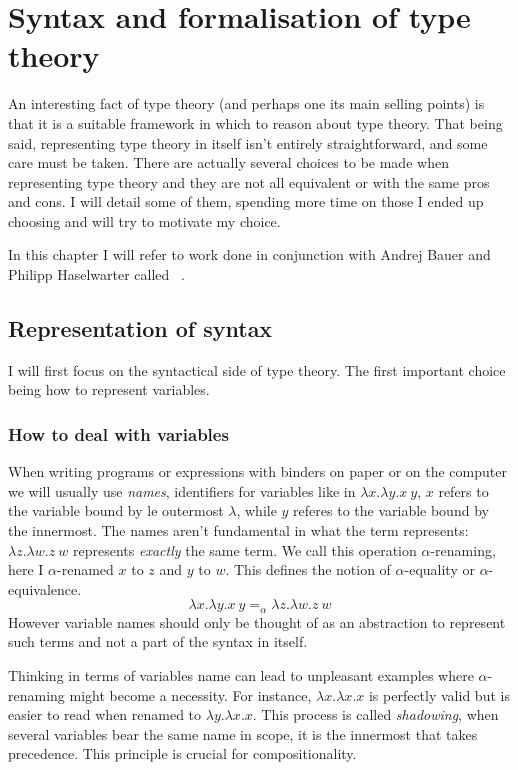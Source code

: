 \chapter{Syntax and formalisation of type theory}

An interesting fact of type theory (and perhaps one its main selling points) is
that it is a suitable framework in which to reason about type theory.
That being said, representing type theory in itself isn't entirely
straightforward, and some care must be taken. There are actually several choices
to be made when representing type theory and they are not all equivalent or with
the same pros and cons.
I will detail some of them, spending more time on those I ended up choosing
and will try to motivate my choice.

In this chapter I will refer to work done in conjunction with Andrej Bauer and
Philipp Haselwarter called \ftt~.

\section{Representation of syntax}

I will first focus on the syntactical side of type theory.
The first important choice being how to represent variables.

\subsection{How to deal with variables}

When writing programs or expressions with binders on paper or on the computer
we will usually use \emph{names}, identifiers for variables like in
\(\lambda x. \lambda y. x\ y\), \(x\) refers to the variable bound by le
outermost \(\lambda\), while \(y\) referes to the variable bound by the
innermost.
The names aren't fundamental in what the term represents:
\(\lambda z. \lambda w. z\ w\) represents \emph{exactly} the same term.
We call this operation \(\alpha\)-renaming, here I \(\alpha\)-renamed \(x\)
to \(z\) and \(y\) to \(w\). This defines the notion of \(\alpha\)-equality
or \(\alpha\)-equivalence.
\[
  \lambda x. \lambda y. x\ y =_\alpha \lambda z. \lambda w. z\ w
\]
However variable names should only be thought of as an abstraction to represent
such terms and not a part of the syntax in itself.

Thinking in terms of variables name can lead to unpleasant examples where
\(\alpha\)-renaming might become a necessity.
For instance, \(\lambda x. \lambda x. x\) is perfectly valid but is easier to
read when renamed to \(\lambda y. \lambda x. x\). This process is called
\emph{shadowing}, when several variables bear the same name in scope, it is the
innermost that takes precedence. This principle is crucial for compositionality.

